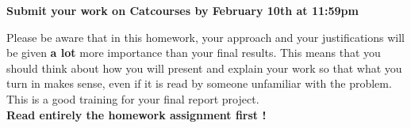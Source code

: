 \documentclass[11pt]{article}
\begin{document}
{\bf Submit your work on Catcourses by February 10th at 11:59pm}

Please be aware that in this homework, your approach and your justifications will be given {\bf a lot} more importance than your final results. This means that you should think about how you will present and explain your work so that what you turn in makes sense, even if it is read by someone unfamiliar with the problem. This is a good training for your final report project.\\
\textbf{Read entirely the homework assignment first !}

\end{document}
